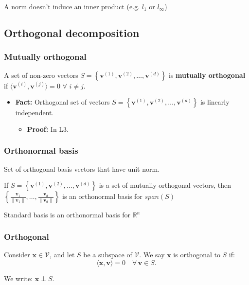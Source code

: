 \begin{warning}
    A norm doesn't induce an inner product (e.g. $l_1$ or $l_{\infty}$)
\end{warning}

\subsection{Orthogonal decomposition}
\subsubsection{Mutually orthogonal}
\begin{definition}
    A set of non-zero vectors \( S = \left\{ \mathbf{v}^{(1)}, \mathbf{v}^{(2)}, \ldots, \mathbf{v}^{(d)} \right\} \) is \textbf{mutually orthogonal} if \( \langle \mathbf{v}^{(i)}, \mathbf{v}^{(j)} \rangle = 0 \) $\forall$ \( i \neq j \).
    \begin{itemize}
        \item \textbf{Fact:} Orthogonal set of vectors \( S = \left\{ \mathbf{v}^{(1)}, \mathbf{v}^{(2)}, \ldots, \mathbf{v}^{(d)} \right\} \) is linearly independent.
        \begin{itemize}
            \item \textbf{Proof:} In L3.
        \end{itemize}
    \end{itemize}
\end{definition}

\subsubsection{Orthonormal basis}
\begin{definition}
    Set of orthogonal basis vectors that have unit norm.
    \vspace{1em}

    If \( S = \left\{ \mathbf{v}^{(1)}, \mathbf{v}^{(2)}, \ldots, \mathbf{v}^{(d)} \right\} \) is a set of mutually orthogonal vectors, then $\left\{ \frac{\mathbf{v}_{1}}{\|\mathbf{v}_{1}\|}, \ldots, \frac{\mathbf{v}_{d}}{\|\mathbf{v}_{d}\|} \right\}$ is an orthonormal basis for $span(S)$
\end{definition}

\begin{example}
    Standard basis is an orthonormal basis for $\mathbb{R}^n$
\end{example}

\subsubsection{Orthogonal}
\begin{definition}
    Consider \( \mathbf{x} \in \mathcal{V} \), and let \( S \) be a subspace of \( \mathcal{V} \). We say \( \mathbf{x} \) is orthogonal to \( S \) if:
        \[
        \langle \mathbf{x}, \mathbf{v} \rangle = 0 \quad \forall \, \mathbf{v} \in S.
        \]
        
        We write: \( \mathbf{x} \perp S \). 
\end{definition}


